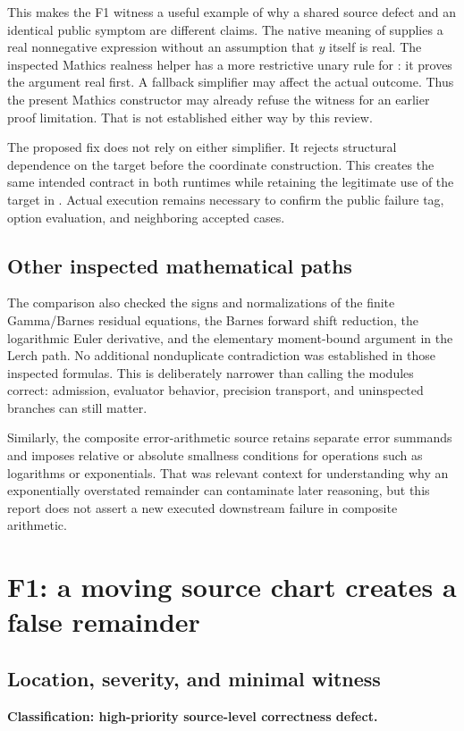 \documentclass[11pt,letterpaper]{article}
\newcommand{\code}[1]{\texttt{\detokenize{#1}}}
\newcommand{\status}[1]{\textbf{\color{accent}#1}}
\begin{document}
This makes the F1 witness a useful example of why a shared source defect and an identical public symptom are different claims. The native meaning of \code{Abs[y]} supplies a real nonnegative expression without an assumption that $y$ itself is real.\cite{wolfram-abs} The inspected Mathics realness helper has a more restrictive unary rule for \code{Abs}: it proves the argument real first. A fallback simplifier may affect the actual outcome. Thus the present Mathics constructor may already refuse the witness for an earlier proof limitation. That is not established either way by this review.\cite{mathics-assumptions}

The proposed fix does not rely on either simplifier. It rejects structural dependence on the target before the coordinate construction. This creates the same intended contract in both runtimes while retaining the legitimate use of the target in \code{CoreInverse}. Actual execution remains necessary to confirm the public failure tag, option evaluation, and neighboring accepted cases.

\subsection{Other inspected mathematical paths}
The comparison also checked the signs and normalizations of the finite Gamma/Barnes residual equations, the Barnes forward shift reduction, the logarithmic Euler derivative, and the elementary moment-bound argument in the Lerch path. No additional nonduplicate contradiction was established in those inspected formulas. This is deliberately narrower than calling the modules correct: admission, evaluator behavior, precision transport, and uninspected branches can still matter.\cite{gamma-checks,barnes-checks,barnes-forward,log-scales,dirichlet}

Similarly, the composite error-arithmetic source retains separate error summands and imposes relative or absolute smallness conditions for operations such as logarithms or exponentials. That was relevant context for understanding why an exponentially overstated remainder can contaminate later reasoning, but this report does not assert a new executed downstream failure in composite arithmetic.\cite{envelopes}

\section{F1: a moving source chart creates a false remainder}
\label{sec:f1}
\subsection{Location, severity, and minimal witness}
\status{Classification: high-priority source-level correctness defect.}
\end{document}
